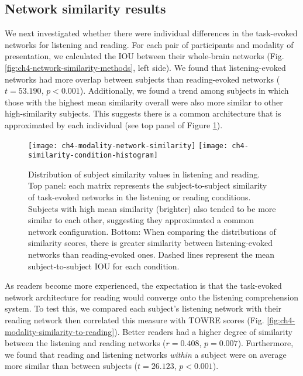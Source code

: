 \subsection{Network similarity results}

We next investigated whether there were individual differences in the task-evoked networks for listening and reading. For each pair of participants and modality of presentation, we calculated the IOU between their whole-brain networks (Fig. \ref{fig:ch4-network-similarity-methods}, left side). We found that listening-evoked networks had more overlap between subjects than reading-evoked networks ($t = 53.190$, $p < 0.001$). Additionally, we found a trend among subjects in which those with the highest mean similarity overall were also more similar to other high-similarity subjects. This suggests there is a common architecture that is approximated by each individual (see top panel of Figure \ref{fig:ch4-modality-network-similarity}).

\begin{figure}[t!]
	\centering
	\texttt{[image: ch4-modality-network-similarity]}
	\texttt{[image: ch4-similarity-condition-histogram]}
    \caption[Network similarity across subjects in listening and reading.] {Distribution of subject similarity values in listening and reading. Top panel: each matrix represents the subject-to-subject similarity of task-evoked networks in the listening or reading conditions. Subjects with high mean similarity (brighter) also tended to be more similar to each other, suggesting they approximated a common network configuration. Bottom: When comparing the distributions of similarity scores, there is greater similarity between listening-evoked networks than reading-evoked ones. Dashed lines represent the mean subject-to-subject IOU for each condition. }
	\label{fig:ch4-modality-network-similarity}
\end{figure}

As readers become more experienced, the expectation is that the task-evoked network architecture for reading would converge onto the listening comprehension system. To test this, we compared each subject's listening network with their reading network then correlated this measure with TOWRE scores (Fig.  \ref{fig:ch4-modality-similarity-to-reading}). Better readers had a higher degree of similarity between the listening and reading networks ($r = 0.408$, $p = 0.007$). Furthermore, we found that reading and listening networks \textit{within} a subject were on average more similar than between subjects ($t = 26.123$, $p < 0.001$). 

